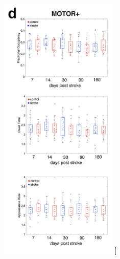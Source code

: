 \documentclass[phd,tocprelim]{cornell}
\renewcommand{\caption}[1]{\singlespacing\hangcaption{#1}\normalspacing}
\begin{document}
\begin{figure}[h!]
		\ContinuedFloat
		\captionsetup{labelformat=adja-page}
    \centering
    \includegraphics[width=0.5\textwidth]{chapter2/SupplementaryFig8d.png}
    \caption[]{}
\end{figure}
\null
\vfill
\clearpage
\null
\vfill
\end{document}
